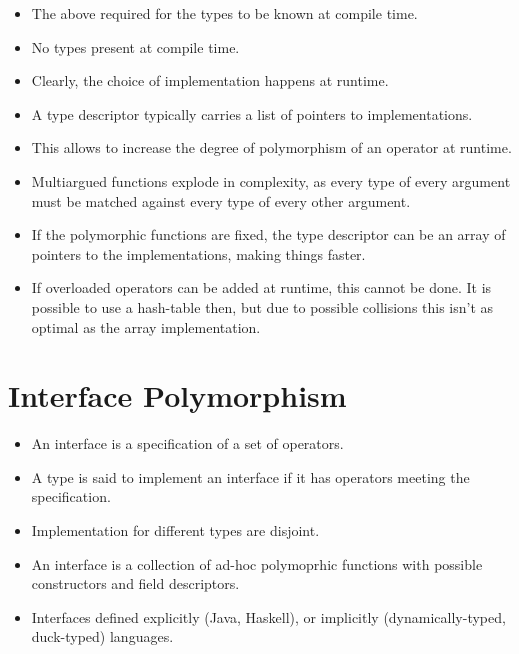 \begin{itemize}

\item The above required for the types to be known at compile time.

\item No types present at compile time.

\item Clearly, the choice of implementation happens at runtime.

\item A type descriptor typically carries a list of pointers to
implementations.

\item This allows to increase the degree of polymorphism of an operator at
runtime.

\item Multiargued functions explode in complexity, as every type of every
argument must be matched against every type of every other argument.

\item If the polymorphic functions are fixed, the type descriptor can be an
array of pointers to the implementations, making things faster.

\item If overloaded operators can be added at runtime, this cannot be done. It
is possible to use a hash-table then, but due to possible collisions this isn't
as optimal as the array implementation.

\end{itemize}

\section{Interface Polymorphism}

\begin{itemize}

\item An interface is a specification of a set of operators.

\item A type is said to implement an interface if it has operators meeting the
specification.

\item Implementation for different types are disjoint.

\item An interface is a collection of ad-hoc polymoprhic functions with
possible constructors and field descriptors.

\item Interfaces defined explicitly (Java, Haskell), or implicitly
(dynamically-typed, duck-typed) languages.

\end{itemize}

